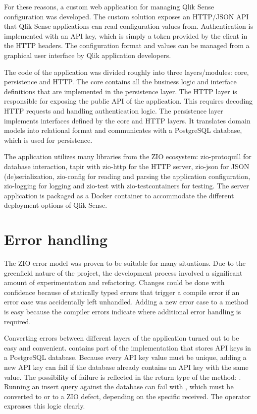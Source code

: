 For these reasons, a custom web application for managing Qlik Sense configuration was developed. The custom solution exposes an HTTP/JSON API that Qlik Sense applications can read configuration values from. Authentication is implemented with an API key, which is simply a token provided by the client in the HTTP headers. The configuration format and values can be managed from a graphical user interface by Qlik application developers.

The code of the application was divided roughly into three layers/modules: core, persistence and HTTP. The core contains all the business logic and interface definitions that are implemented in the persistence layer. The HTTP layer is responsible for exposing the public API of the application. This requires decoding HTTP requests and handling authentication logic. The persistence layer implements interfaces defined by the core and HTTP layers. It translates domain models into relational format and communicates with a PostgreSQL database, which is used for persistence.

The application utilizes many libraries from the ZIO ecosystem: zio-protoquill for database interaction, tapir with zio-http for the HTTP server, zio-json for JSON (de)serialization, zio-config for reading and parsing the application configuration, zio-logging for logging and zio-test with zio-testcontainers for testing. The server application is packaged as a Docker container to accommodate the different deployment options of Qlik Sense.


\section{Error handling}
The ZIO error model was proven to be suitable for many situations. Due to the greenfield nature of the project, the development process involved a significant amount of experimentation and refactoring. Changes could be done with confidence because of statically typed errors that trigger a compile error if an error case was accidentally left unhandled. Adding a new error case to a method is easy because the compiler errors indicate where additional error handling is required.

Converting errors between different layers of the application turned out to be easy and convenient.  contains part of the  implementation that stores API keys in a PostgreSQL database. Because every API key value must be unique, adding a new API key can fail if the database already contains an API key with the same value. The possibility of failure is reflected in the return type of the  method: . Running an insert query against the database can fail with , which must be converted to  or to a ZIO defect, depending on the specific  received. The  operator expresses this logic clearly.

